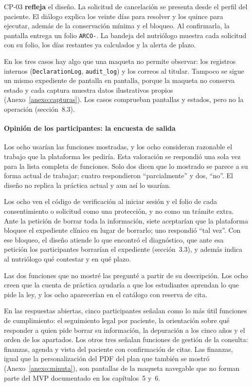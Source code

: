 \documentclass[12pt, a4paper]{article}
\begin{document}
CP-03 \textbf{refleja} el diseño. La solicitud de cancelación se
presenta desde el perfil del paciente. El diálogo explica los veinte
días para resolver y los quince para ejecutar, además de la conservación
mínima y el bloqueo. Al confirmarla, la pantalla entrega un folio
\texttt{ARCO-}. La bandeja del nutriólogo muestra cada solicitud con su
folio, los días restantes ya calculados y la alerta de plazo.

En los tres casos hay algo que una maqueta no permite observar: los
registros internos (\texttt{DeclarationLog}, \texttt{audit\_log}) y los
correos al titular. Tampoco se sigue un mismo expediente de pantalla en
pantalla, porque la maqueta no conserva estado y cada captura muestra
datos ilustrativos propios (Anexo~\ref{anexo:capturas}). Los
casos comprueban pantallas y estados, pero no la operación
(sección~8.3).

\paragraph{Opinión de los participantes: la encuesta de salida}
Los ocho usarían las funciones mostradas, y los ocho consideran
razonable el trabajo que la plataforma les pediría. Esta valoración se
respondió una sola vez para la lista completa de funciones. Solo dos dicen que lo mostrado se parece a su forma actual
de trabajar; cuatro respondieron ``parcialmente'' y dos, ``no''. El diseño no replica la práctica actual y aun así lo usarían.

Los ocho ven el código de verificación al iniciar sesión y el folio de
cada consentimiento o solicitud como una protección, y no como un
trámite extra. Ante la petición de borrar toda la información, siete
aceptarían que la plataforma bloquee el expediente clínico en lugar de
borrarlo; uno respondió ``tal vez''. Con ese bloqueo, el diseño atiende lo que encontró el
diagnóstico, que ante esa petición los participantes borrarían el expediente (sección~3.3), y además indica al nutriólogo
qué contestar y en qué plazo.

Las dos funciones que no mostré las pregunté a partir de su
descripción. Los ocho creen que la cuenta de práctica ayudaría a que los
estudiantes aprendan lo que pide la ley, y los ocho aparecerían en el
catálogo con reserva de cita.

En las respuestas abiertas, cinco participantes señalan como lo más útil
funciones de cumplimiento: el seguimiento legal por paciente, la
orientación sobre qué responder a quien pide borrar su información, la
depuración a los cinco años y el orden de los apartados. Los otros tres
señalan funciones de gestión de la consulta: finanzas, agenda y vista
del paciente con confirmación de citas. Las finanzas, igual que la
personalización del PDF del plan que también se mostró
(Anexo~\ref{anexo:minuta}), son pantallas de la maqueta navegable que
no forman parte del MVP documentado en los capítulos~5 y~6.
\end{document}
